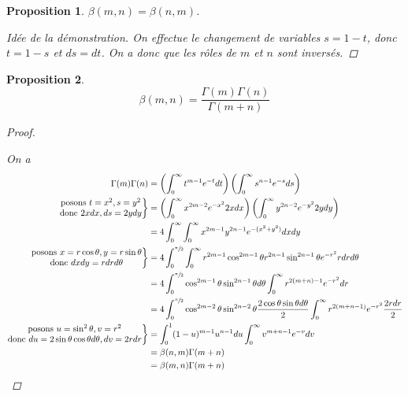 \documentclass{report}
\newcommand*{\dint}[3]{\displaystyle\int_{#1}^{#2}#3}
\newtheorem*{prop}{Proposition}
\theoremstyle{definition}
\theoremstyle{remark}
\begin{document}
	\begin{prop}
		$\beta(m,n) = \beta(n,m)$.
		\renewcommand{\qedsymbol}{\#}
		\begin{proof}[Id\'ee de la d\'emonstration]
			On effectue le changement de variables $s=1-t$, donc $t=1-s$ et $ds=dt$. On a donc que les r\^oles de $m$ et $n$ sont invers\'es.
		\end{proof}
		\renewcommand{\qedsymbol}{$\square$}
	\end{prop}
	\begin{prop}
		\begin{equation*}
			\beta(m,n) = \dfrac{\Gamma(m)\Gamma(n)}{\Gamma(m+n)}
		\end{equation*}
		\begin{proof}~

			On a
			\begin{align*}
				\Gamma(m)\Gamma(n)&= \left( \dint{0}{\infty}{t^{m-1}e^{-t} dt} \right) \left( \dint{0}{\infty}{s^{n-1}e^{-s} ds} \right)\\
				\left.\begin{matrix}
					\text{posons } t=x^2, s=y^2\\
					\text{donc } 2xdx, ds=2ydy
				\end{matrix}\right\}&= \left( \dint{0}{\infty}{x^{2m-2}e^{-x^2} 2xdx} \right) \left( \dint{0}{\infty}{y^{2n-2}e^{-y^2} 2ydy} \right)\\
				&= 4 \dint{0}{\infty}{\dint{0}{\infty}{x^{2m-1}y^{2n-1} e^{-(x^2+y^2)} dxdy}}\\
				\left.\begin{matrix}
					\text{posons } x=r\cos\theta, y=r\sin\theta\\
					\text{donc } dxdy=rdrd\theta
				\end{matrix}\right\}&= 4 \dint{0}{\sfrac{\pi}{2}}{\dint{0}{\infty}{r^{2m-1}\cos^{2m-1}\theta r^{2n-1}\sin^{2n-1}\theta e^{-r^2} rdrd\theta}}\\
				&= 4 \dint{0}{\sfrac{\pi}{2}}{\cos^{2m-1}\theta \sin^{2n-1}\theta d\theta} \dint{0}{\infty}{r^{2(m+n)-1} e^{-r^2} dr}\\
				&= 4 \dint{0}{\sfrac{\pi}{2}}{\cos^{2m-2}\theta \sin^{2n-2}}\theta \dfrac{2\cos\theta \sin\theta d\theta}{2} \dint{0}{\infty}{r^{2(m+n-1)} e^{-r^2} \dfrac{2rdr}{2}}\\
				\left.\begin{matrix}
					\text{posons } u=\sin^2\theta, v=r^2\\
					\text{donc } du=2\sin\theta\cos\theta d\theta, dv=2rdr
				\end{matrix}\right\}&= \dint{0}{1}{(1-u)^{m-1} u^{n-1} du} \dint{0}{\infty}{v^{m+n-1} e^{-v} dv}\\
				&= \beta(n,m) \Gamma(m+n)\\
				&= \beta(m,n) \Gamma(m+n)
			\end{align*}
		\end{proof}
	\end{prop}
\end{document}
